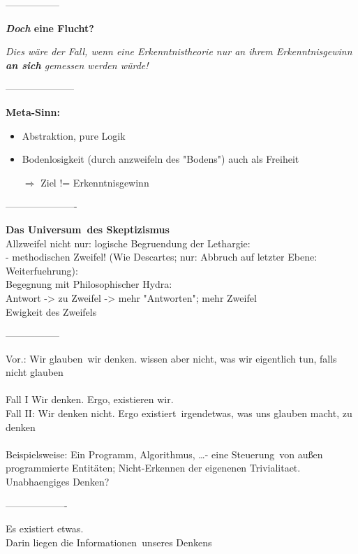 \documentclass[12pt,a4paper]{article}
\begin{document}
-----------------

\textbf{\emph{Doch} eine Flucht?}\\
\begin{center}
\emph{Dies wäre der Fall, wenn eine Erkenntnistheorie nur an ihrem Erkenntnisgewinn \textbf{an sich} gemessen werden würde!}
\end{center}

---------------------

\textbf{Meta-Sinn:}
\begin{itemize}
\item Abstraktion, pure Logik
\item Bodenlosigkeit (durch anzweifeln des "Bodens") auch als Freiheit
\item[$\Rightarrow$] Ziel != Erkenntnisgewinn
\end{itemize}

----------------------

\textbf{Das \glqq Universum\grqq\ des Skeptizismus}\\
Allzweifel nicht nur: logische Begruendung der Lethargie:\\
- methodischen Zweifel! (Wie Descartes; nur: Abbruch auf letzter Ebene: Weiterfuehrung):\\
Begegnung mit Philosophischer Hydra:\\
Antwort -> zu Zweifel -> mehr "Antworten"; mehr Zweifel\\
Ewigkeit des Zweifels

-----------------

Vor.: Wir \glqq glauben\grqq\ wir denken. wissen aber nicht, was wir eigentlich tun, falls nicht \glqq glauben\grqq \\
\ \\
Fall I Wir denken. Ergo, existieren \glqq wir\grqq . \\
Fall II: Wir denken nicht. Ergo \glqq existiert\grqq\ irgendetwas, was uns glauben macht, zu denken\\
\ \\
Beispielsweise: Ein Programm, Algorithmus, \ldots - eine \glqq Steuerung\grqq\ von \glqq außen\grqq \\

programmierte Entitäten; Nicht-Erkennen der eigenenen Trivialitaet.\\
Unabhaengiges Denken?

-------------------

\begin{center}
Es existiert \glqq etwas\grqq .\\
Darin liegen die \glqq Informationen\grqq\ unseres \glqq Denkens\grqq
\end{center}
\end{document}

